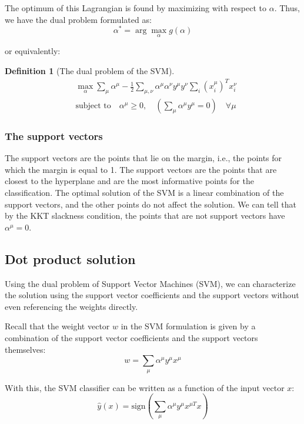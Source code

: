 \documentclass[11pt]{book} %
\newtheorem{definition}{Definition}[section]
\begin{document}
The optimum of this Lagrangian is found by maximizing with respect to \( \alpha \). Thus, we have the dual problem formulated as:
\begin{equation}
    \alpha^* = \arg \max_{\alpha} g(\alpha) 
\end{equation}

or equivalently:
\begin{definition}[The dual problem of the SVM]
    \begin{align*}
        &\max_{\alpha} \sum_{\mu} \alpha^{\mu} - \frac{1}{2} \sum_{\mu,\nu} \alpha^{\mu} \alpha^{\nu} y^{\mu} y^{\nu} \sum_{i} (x_i^{\mu})^T x_i^{\nu} \\
        &\text{subject to} \quad \alpha^{\mu} \geq 0, \quad \left( \sum_{\mu} \alpha^{\mu} y^{\mu} = 0 \right) \quad \forall \mu
    \end{align*}
\end{definition}

\subsubsection{The support vectors}
The support vectors are the points that lie on the margin, i.e., the points for which the margin is equal to 1.
The support vectors are the points that are closest to the hyperplane and are the most informative points for the classification.
The optimal solution of the SVM is a linear combination of the support vectors, and the other points do not affect the solution.
We can tell that by the KKT slackness condition, the points that are not support vectors have $\alpha^{\mu} = 0$.


%
%

\subsection{Dot product solution}

Using the dual problem of Support Vector Machines (SVM), we can characterize the solution using the support vector coefficients and the support vectors without even referencing the weights directly.

Recall that the weight vector \( w \) in the SVM formulation is given by a combination of the support vector coefficients and the support vectors themselves:
\begin{equation}
    w = \sum_{\mu} \alpha^{\mu} y^{\mu} x^{\mu} 
\end{equation}

With this, the SVM classifier can be written as a function of the input vector \( x \):
\begin{equation}
    \hat{y}(x) = \text{sign} \left( \sum_{\mu} \alpha^{\mu} y^{\mu} x^{\mu T} x \right) 
\end{equation}
\end{document}
